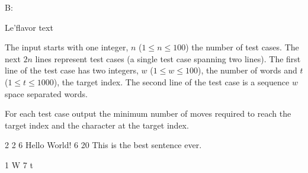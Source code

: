 \begin{problem}{B:  }

Le'flavor text

\end{problem}

\begin{formalin}
The input starts with one integer, $n$ ($1 \leq n \leq 100$) the number of test cases.
The next $2n$ lines represent test cases (a single test case spanning two lines).
The first line of the test case has two integers, $w$ ($1 \leq w \leq 100$), the number of words and $t$ ($1 \leq t \leq 1000$), the target index.
The second line of the test case is a sequence $w$ space separated words.
\end{formalin}

\begin{formalout}
For each test case output the minimum number of moves required to reach the target index and the character at the target index.
\end{formalout}

\begin{datain}
2
2 6
Hello World!
6 20
This is the best sentence ever.
\end{datain}

\begin{dataout}
1 W
7 t
\end{dataout}

